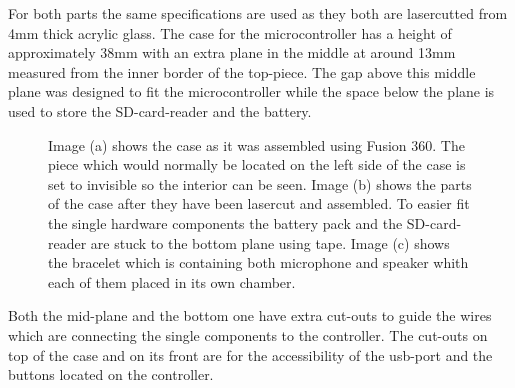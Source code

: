 For both parts the same specifications are used as they both are lasercutted from 4mm thick acrylic glass.
The case for the microcontroller has a height of approximately 38mm with an extra plane in the middle at around 13mm measured from the inner border of the top-piece.
The gap above this middle plane was designed to fit the microcontroller while the space below the plane is used to store the SD-card-reader and the battery.
\begin{figure}
	\begin{center}
		\hspace{0.5cm}
	\end{center}
	\caption{Image (a) shows the case as it was assembled using Fusion 360.
		The piece which would normally be located on the left side of the case is set to invisible so the interior can be seen.
		Image (b) shows the parts of the case after they have been lasercut and assembled.
		To easier fit the single hardware components the battery pack and the SD-card-reader are stuck to the bottom plane using tape.
		Image (c) shows the bracelet which is containing both microphone and speaker whith each of them placed in its own chamber.
		}
	\label{fig:cad_designs}
\end{figure}

Both the mid-plane and the bottom one have extra cut-outs to guide the wires which are connecting the single components to the controller.
The cut-outs on top of the case and on its front are for the accessibility of the usb-port and the buttons located on the controller.

